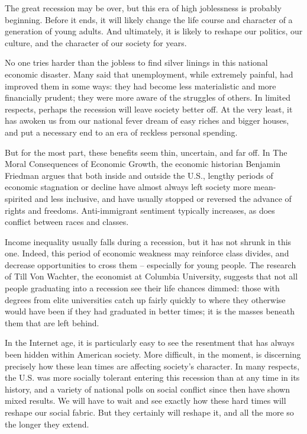 The great recession may be over, but this era of high joblessness is probably beginning. Before it ends, it will likely change the life course and character of a generation of young adults. And ultimately, it is likely to reshape our politics, our culture, and the character of our society for years.


No one tries harder than the jobless to find silver linings in this national economic disaster. Many said that unemployment, while extremely painful, had improved them in some ways: they had become less materialistic and more financially prudent; they were more aware of the struggles of others. In limited respects, perhaps the recession will leave society better off. At the very least, it has awoken us from our national fever dream of easy riches and bigger houses, and put a necessary end to an era of reckless personal spending.


But for the most part, these benefits seem thin, uncertain, and far off. In The Moral Consequences of Economic Growth, the economic historian Benjamin Friedman argues that both inside and outside the U.S., lengthy periods of economic stagnation or decline have almost always left society more mean-spirited and less inclusive, and have usually stopped or reversed the advance of rights and freedoms. Anti-immigrant sentiment typically increases, as does conflict between races and classes.


Income inequality usually falls during a recession, but it has not shrunk in this one. Indeed, this period of economic weakness may reinforce class divides, and decrease opportunities to cross them – especially for young people. The research of Till Von Wachter, the economist at Columbia University, suggests that not all people graduating into a recession see their life chances dimmed: those with degrees from elite universities catch up fairly quickly to where they otherwise would have been if they had graduated in better times; it is the masses beneath them that are left behind.


In the Internet age, it is particularly easy to see the resentment that has always been hidden within American society. More difficult, in the moment, is discerning precisely how these lean times are affecting society's character. In many respects, the U.S. was more socially tolerant entering this recession than at any time in its history, and a variety of national polls on social conflict since then have shown mixed results. We will have to wait and see exactly how these hard times will reshape our social fabric. But they certainly will reshape it, and all the more so the longer they extend.